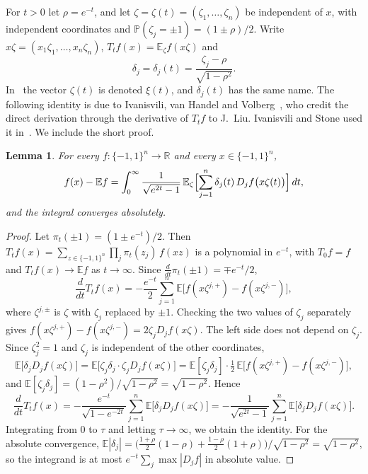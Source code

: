\documentclass[11pt]{amsart}
\newtheorem{lemma}[theorem]{Lemma}
\theoremstyle{remark}
\numberwithin{equation}{section}
\newcommand{\R}{\mathbb{R}}
\newcommand{\E}{\mathbb{E}}
\renewcommand{\P}{\mathbb{P}}
\begin{document}
For $t>0$ let $\rho=e^{-t}$, and let $\zeta=\zeta(t)=(\zeta_1,\dots,\zeta_n)$ be independent of $x$, with independent coordinates and $\P(\zeta_j=\pm1)=(1\pm\rho)/2$. Write $x\zeta=(x_1\zeta_1,\dots,x_n\zeta_n)$, $T_tf(x)=\E_\zeta f(x\zeta)$ and
\[
\delta_j=\delta_j(t)=\frac{\zeta_j-\rho}{\sqrt{1-\rho^2}}.
\]
In~\cite{IvHV} the vector $\zeta(t)$ is denoted $\xi(t)$, and $\delta_j(t)$ has the same name. The following identity is due to Ivanisvili, van Handel and Volberg~\cite[Lemma~2.1 and Remark~2.2]{IvHV}, who credit the direct derivation through the derivative of $T_tf$ to J.~Liu. Ivanisvili and Stone used it in~\cite[(2.5)]{IS24}. We include the short proof.

\begin{lemma}\label{lem:ivhv}
For every $f\colon\{-1,1\}^n\to\R$ and every $x\in\{-1,1\}^n$,
\[
f(x)-\E f=\int_0^\infty\frac{1}{\sqrt{e^{2t}-1}}\,\E_\zeta\Bigl[\sum_{j=1}^n\delta_j(t)\,D_jf\bigl(x\zeta(t)\bigr)\Bigr]\,dt,
\]
and the integral converges absolutely.
\end{lemma}

\begin{proof}
Let $\pi_t(\pm1)=(1\pm e^{-t})/2$. Then $T_tf(x)=\sum_{z\in\{-1,1\}^n}\prod_j\pi_t(z_j)\,f(xz)$ is a polynomial in $e^{-t}$, with $T_0f=f$ and $T_tf(x)\to\E f$ as $t\to\infty$. Since $\frac{d}{dt}\pi_t(\pm1)=\mp e^{-t}/2$,
\[
\frac{d}{dt}T_tf(x)=-\frac{e^{-t}}{2}\sum_{j=1}^n\E\bigl[f(x\zeta^{j,+})-f(x\zeta^{j,-})\bigr],
\]
where $\zeta^{j,\pm}$ is $\zeta$ with $\zeta_j$ replaced by $\pm1$. Checking the two values of $\zeta_j$ separately gives $f(x\zeta^{j,+})-f(x\zeta^{j,-})=2\zeta_jD_jf(x\zeta)$. The left side does not depend on $\zeta_j$. Since $\zeta_j^2=1$ and $\zeta_j$ is independent of the other coordinates,
\[
\E\bigl[\delta_jD_jf(x\zeta)\bigr]=\E\bigl[\zeta_j\delta_j\cdot\zeta_jD_jf(x\zeta)\bigr]=\E[\zeta_j\delta_j]\cdot\tfrac12\,\E\bigl[f(x\zeta^{j,+})-f(x\zeta^{j,-})\bigr],
\]
and $\E[\zeta_j\delta_j]=(1-\rho^2)/\sqrt{1-\rho^2}=\sqrt{1-\rho^2}$. Hence
\[
\frac{d}{dt}T_tf(x)=-\frac{e^{-t}}{\sqrt{1-e^{-2t}}}\sum_{j=1}^n\E\bigl[\delta_jD_jf(x\zeta)\bigr]=-\frac{1}{\sqrt{e^{2t}-1}}\sum_{j=1}^n\E\bigl[\delta_jD_jf(x\zeta)\bigr].
\]
Integrating from $0$ to $\tau$ and letting $\tau\to\infty$, we obtain the identity. For the absolute convergence, $\E|\delta_j|=\bigl(\tfrac{1+\rho}2(1-\rho)+\tfrac{1-\rho}2(1+\rho)\bigr)/\sqrt{1-\rho^2}=\sqrt{1-\rho^2}$, so the integrand is at most $e^{-t}\sum_j\max|D_jf|$ in absolute value.
\end{proof}
\end{document}
